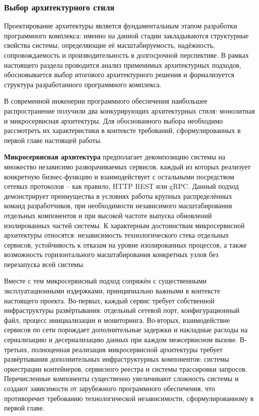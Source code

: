 \documentclass[
]{article}
\begin{document}
\subsubsection{Выбор архитектурного
стиля}\label{ux432ux44bux431ux43eux440-ux430ux440ux445ux438ux442ux435ux43aux442ux443ux440ux43dux43eux433ux43e-ux441ux442ux438ux43bux44f}

Проектирование архитектуры является фундаментальным этапом разработки
программного комплекса: именно на данной стадии закладываются
структурные свойства системы, определяющие её масштабируемость,
надёжность, сопровождаемость и производительность в долгосрочной
перспективе. В рамках настоящего раздела проводится анализ применимых
архитектурных подходов, обосновывается выбор итогового архитектурного
решения и формализуется структура разработанного программного комплекса.

В современной инженерии программного обеспечения наибольшее
распространение получили два конкурирующих архитектурных стиля:
монолитная и микросервисная архитектуры. Для обоснованного выбора
необходимо рассмотреть их характеристики в контексте требований,
сформулированных в первой главе настоящей работы.

\textbf{Микросервисная архитектура} предполагает декомпозицию системы на
множество независимо разворачиваемых сервисов, каждый из которых
реализует конкретную бизнес-функцию и взаимодействует с остальными
посредством сетевых протоколов -- как правило, HTTP REST или gRPC.
Данный подход демонстрирует преимущества в условиях работы крупных
распределённых команд разработчиков, при необходимости независимого
масштабирования отдельных компонентов и при высокой частоте выпуска
обновлений изолированных частей системы. К характерным достоинствам
микросервисной архитектуры относятся: независимость технологического
стека отдельных сервисов, устойчивость к отказам на уровне изолированных
процессов, а также возможность горизонтального масштабирования
конкретных узлов без перезапуска всей системы.

Вместе с тем микросервисный подход сопряжён с существенными
эксплуатационными издержками, принципиально важными в контексте
настоящего проекта. Во-первых, каждый сервис требует собственной
инфраструктуры развёртывания: отдельный сетевой порт, конфигурационный
файл, процесс инициализации и мониторинга. Во-вторых, взаимодействие
сервисов по сети порождает дополнительные задержки и накладные расходы
на сериализацию и десериализацию данных при каждом межсервисном вызове.
В-третьих, полноценная реализация микросервисной архитектуры требует
развёртывания дополнительных инфраструктурных компонентов: системы
оркестрации контейнеров, сервисного реестра и системы трассировки
запросов. Перечисленные компоненты существенно увеличивают сложность
системы и создают зависимости от зарубежного программного обеспечения,
что противоречит требованию технологической независимости,
сформулированному в первой главе.
\end{document}
